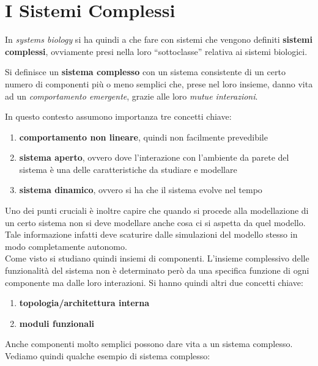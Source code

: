 \documentclass[a4paper,12pt, oneside]{book}
\begin{document}
\section{I Sistemi Complessi}
In \textit{systems biology} si ha quindi a che fare con sistemi che vengono
definiti \textbf{sistemi complessi}, ovviamente presi nella loro ``sottoclasse''
relativa ai sistemi biologici.
\begin{definizione}
  Si definisce un \textbf{sistema complesso} con un sistema consistente di un
  certo numero di componenti più o meno semplici che, prese nel loro insieme,
  danno vita ad un \textit{comportamento emergente}, grazie alle loro
  \textit{mutue interazioni}. 
\end{definizione}
In questo contesto assumono importanza tre concetti chiave:
\begin{enumerate}
  \item \textbf{comportamento non lineare}, quindi non facilmente prevedibile
  \item \textbf{sistema aperto}, ovvero dove l'interazione con l'ambiente da
  parete del sistema è una delle caratteristiche da studiare e modellare
  \item \textbf{sistema dinamico}, ovvero si ha che il sistema evolve nel tempo 
\end{enumerate}
Uno dei punti cruciali è inoltre capire che quando si procede alla modellazione
di un certo sistema non si deve modellare anche cosa ci si aspetta da quel
modello. Tale informazione infatti deve scaturire dalle simulazioni del modello
stesso in modo completamente autonomo.\\
Come visto si studiano quindi insiemi di componenti. L'insieme complessivo delle
funzionalità del sistema non è determinato però da una specifica funzione di
ogni componente ma dalle loro interazioni. Si hanno quindi altri due concetti
chiave:
\begin{enumerate}
  \item \textbf{topologia/architettura interna}
  \item \textbf{moduli funzionali}
\end{enumerate}
Anche componenti molto semplici possono dare vita a un sistema complesso.\\ 
Vediamo quindi qualche esempio di sistema complesso:
\end{document}
